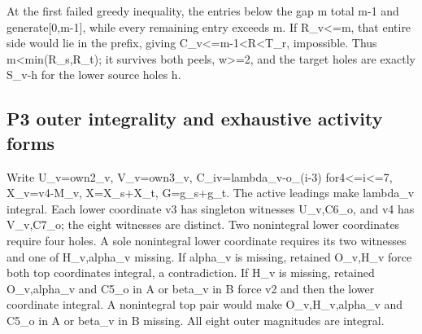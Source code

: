 \documentclass[10pt,a4paper]{article}
\theoremstyle{definition}
\begin{document}
At the first failed greedy inequality,\allowbreak{} the entries below the gap m total
m-1 and generate{[}0,\allowbreak{}m-1{]},\allowbreak{} while every remaining entry exceeds m. If
R\_\allowbreak{}v\textless=\allowbreak{}m,\allowbreak{} that entire side would lie in the prefix,\allowbreak{} giving
C\_\allowbreak{}v\textless=\allowbreak{}m-1\textless R\textless T\_\allowbreak{}r,\allowbreak{} impossible. Thus
m\textless min(R\_\allowbreak{}s,\allowbreak{}R\_\allowbreak{}t); it survives both peels,\allowbreak{} w\textgreater=\allowbreak{}2,\allowbreak{} and
the target holes are exactly S\_\allowbreak{}v-h for the lower source holes h.

\hypertarget{p3-outer-integrality-and-exhaustive-activity-forms}{%
\subsection{P3 outer integrality and exhaustive activity
forms}\label{p3-outer-integrality-and-exhaustive-activity-forms}}

Write U\_\allowbreak{}v=\allowbreak{}own2\_\allowbreak{}v,\allowbreak{} V\_\allowbreak{}v=\allowbreak{}own3\_\allowbreak{}v,\allowbreak{} C\_\allowbreak{}iv=\allowbreak{}lambda\_\allowbreak{}v-o\_\allowbreak{}(i-3)
for4\textless=\allowbreak{}i\textless=\allowbreak{}7,\allowbreak{} X\_\allowbreak{}v=\allowbreak{}v4-M\_\allowbreak{}v,\allowbreak{} X=\allowbreak{}X\_\allowbreak{}s+\allowbreak{}X\_\allowbreak{}t,\allowbreak{} G=\allowbreak{}g\_\allowbreak{}s+\allowbreak{}g\_\allowbreak{}t. The
active leadings make lambda\_\allowbreak{}v integral. Each lower coordinate v3 has
singleton witnesses U\_\allowbreak{}v,\allowbreak{}C6\_\allowbreak{}o,\allowbreak{} and v4 has V\_\allowbreak{}v,\allowbreak{}C7\_\allowbreak{}o; the eight
witnesses are distinct. Two nonintegral lower coordinates require four
holes. A sole nonintegral lower coordinate requires its two witnesses
and one of H\_\allowbreak{}v,\allowbreak{}alpha\_\allowbreak{}v missing. If alpha\_\allowbreak{}v is missing,\allowbreak{} retained
O\_\allowbreak{}v,\allowbreak{}H\_\allowbreak{}v force both top coordinates integral,\allowbreak{} a contradiction. If H\_\allowbreak{}v
is missing,\allowbreak{} retained O\_\allowbreak{}v,\allowbreak{}alpha\_\allowbreak{}v and C5\_\allowbreak{}o in A or beta\_\allowbreak{}v in B force
v2 and then the lower coordinate integral. A nonintegral top pair would
make O\_\allowbreak{}v,\allowbreak{}H\_\allowbreak{}v,\allowbreak{}alpha\_\allowbreak{}v and C5\_\allowbreak{}o in A or beta\_\allowbreak{}v in B missing. All
eight outer magnitudes are integral.
\end{document}
